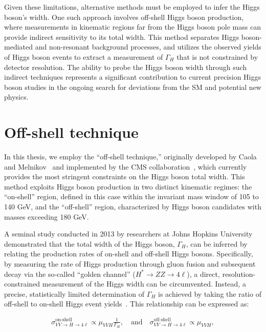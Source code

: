 Given these limitations, alternative methods must be employed to infer the Higgs boson's width. One such approach involves off-shell Higgs boson production, where measurements in kinematic regions far from the Higgs boson pole mass can provide indirect sensitivity to its total width. This method separates Higgs boson-mediated and non-resonant background processes, and utilizes the observed yields of Higgs boson events to extract a measurement of \( \Gamma_H \) that is not constrained by detector resolution. The ability to probe the Higgs boson width through such indirect techniques represents a significant contribution to current precision Higgs boson studies in the ongoing search for deviations from the SM and potential new physics.

\section{Off-shell technique}

In this thesis, we employ the ``off-shell technique,'' originally developed by Caola and Melnikov~\cite{13074935} and implemented by the CMS collaboration~\cite{1405345570}, which currently provides the most stringent constraints on the Higgs boson total width. This method exploits Higgs boson production in two distinct kinematic regimes: the ``on-shell'' region, defined in this case within the invariant mass window of 105 to 140 GeV, and the ``off-shell'' region, characterized by Higgs boson candidates with masses exceeding 180 GeV.

A seminal study conducted in 2013 by researchers at Johns Hopkins University~\cite{13074935} demonstrated that the total width of the Higgs boson, \( \Gamma_H \), can be inferred by relating the production rates of on-shell and off-shell Higgs bosons. Specifically, by measuring the rate of Higgs production through gluon fusion and subsequent decay via the so-called ``golden channel'' (\( H^* \to ZZ \to 4\ell \)), a direct, resolution-constrained measurement of the Higgs width can be circumvented. Instead, a precise, statistically limited determination of \( \Gamma_H \) is achieved by taking the ratio of off-shell to on-shell Higgs event yields~\cite{190100174}. This relationship can be expressed as:

\begin{equation}
\label{eq:resonant}
\begin{gathered}
\sigma^\text{on-shell}_{VV \to H \to 4\ell} \propto \mu_{VVH} \frac{1}{\Gamma_H}, 
\quad\text{and}\quad
\sigma^\text{off-shell}_{VV \to H \to 4\ell} \propto \mu_{VVH},
\end{gathered}
\end{equation}

